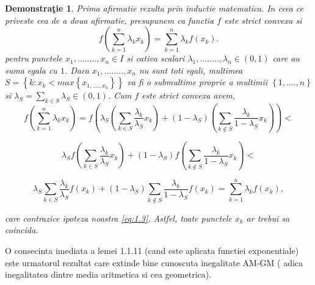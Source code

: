 \documentclass[a4paper,12pt,oneside]{report}
\newtheorem{demonstration}{Demonstra\c tie}
\begin{document}
\begin{demonstration}
Prima afirmatie rezulta prin inductie matematica. In ceea ce priveste cea de a doua afirmatie, presupunem ca functia \(f\) este strict convexa si 
\begin{displaymath}
  f\left ( \sum_{k = 1}^{n} \lambda _{k}x_{k}\right )=  \sum_{k = 1}^{n}\lambda _{k}f\left ( x_{k} \right ). \label{eq:1.3} \tag{1.3}
\end{displaymath}
pentru  punctele \(x_{1}, ........, x_{n} \in I\) si cativa scalari \(\lambda _{1}, ........, \lambda _{n} \in \left ( 0 , 1\right )\) care au suma egala cu \(1\). Daca \(x_{1}, ........, x_{n}\) nu sunt toti egali, multimea \(S = \left \{ k: x_{k}<  max \left \{ x_{1,....,x_{n}} \right \} \right \}\) va fi o submultime proprie a multimii  \(\left \{ 1,....,n \right \}\) si \(\lambda _{S} = \sum_{k \in S}^{}\lambda _{S} \in \left ( 0,1 \right )\). Cum \(f\) este strict convexa avem, 
\begin{displaymath}
  f\left ( \sum_{k=1}^{n}\lambda _{k}x_{k} \right ) = f\left ( \lambda _{S}\left ( \sum_{k\in S}^{}\frac{\lambda _{k}}{\lambda _{S}} x_{k}\right ) +\left ( 1-\lambda _{S} \right )\left ( \sum_{k\notin S}^{} \frac{\lambda _{k}}{1 - \lambda _{S}}x_{k}\right )\right ) < 
\end{displaymath}
  
\begin{displaymath}
  \lambda _{S}f\left ( \sum_{k\in S}^{}\frac{\lambda _{k}}{\lambda _{S}} x_{k}\right ) +\left ( 1 - \lambda _{S} \right )f\left ( \sum_{k\notin S}^{}\frac{\lambda _{k}}{1 - \lambda _{S}} x_{k}\right ) < 
\end{displaymath}
  
\begin{displaymath}
  \lambda _{S} \sum_{k\in S}^{}\frac{\lambda _{k}}{\lambda _{S}} f\left ( x_{k} \right ) +\left ( 1 - \lambda _{S} \right ) \sum_{k\notin S}^{}\frac{\lambda _{k}}{1 - \lambda _{S}}f\left ( x_{k} \right )= \sum_{k=1}^{n}\lambda _{k}f\left ( x_{k} \right ),
\end{displaymath}
  

care contrazice ipoteza noastra \ref{eq:1.3}. Astfel, toate punctele \(x_{k}\) ar trebui sa coincida.
\end{demonstration}

O consecinta imediata a lemei 1.1.11 (cand este aplicata functiei exponentiale) este urmatorul rezultat care extinde bine cunoscuta inegalitate AM-GM ( adica inegalitatea dintre media aritmetica si cea geometrica).
\end{document}
